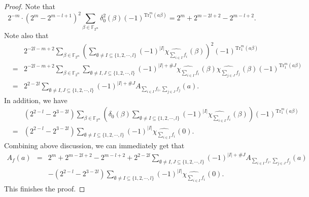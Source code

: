 \documentclass[10pt]{article}
\newcommand{\F}{\mathbb{F}}
\newcommand{\0}{\textbf{0}}
\newcommand{\1}{\textbf{1}}
\newcommand{\Tr}{\mathrm{Tr}_1^m}
\newcommand{\W}[2][]{\widehat{\chi_{#2}}^{#1}}
\newcommand{\CardI}{\left|I\right|}
\begin{document}
{\begin{proof}
Note that
$$2^{-m}\cdot \left(2^m-2^{m-l+1}\right)^2\sum_{\beta\in\F_{2^m}}\delta_0^2(\beta)(-1)^{\Tr({a}\beta)}=2^m+2^{m-2l+2}-2^{m-l+2}.$$
Note also that
\begin{eqnarray*}
&&2^{-2l-m+2}\sum_{\beta\in\F_{2^m}}\left(\sum_{\emptyset\neq I\subseteq \{1,2,\cdots, l\}}(-1)^{\CardI}\W {\sum\limits_{i\in I}f_i}(\beta)\right)^2(-1)^{\Tr({a}\beta)}\\
&=&2^{-2l-m+2}\sum_{\beta\in\F_{2^m}}\sum_{\emptyset\neq I, J \subseteq \{1,2,\cdots, l\}}(-1)^{\CardI+\# J}\W {\sum\limits_{i\in I}f_i}(\beta)\W {\sum\limits_{j\in J}f_j}(\beta)(-1)^{\Tr({a}\beta)}\\
&=&2^{2-2l}\sum_{\emptyset\neq I, J \subseteq \{1,2,\cdots, l\}}(-1)^{\CardI+\# J}A_{\sum\limits_{i\in I}f_i, \sum\limits_{j\in J}f_j}({a}).
\end{eqnarray*}
In addition, we have
\begin{eqnarray*}
&&(2^{2-l}-2^{3-2l})\sum_{\beta\in\F_{2^m}}\left(\delta_0(\beta)\sum_{\emptyset\neq I\subseteq \{1,2,\cdots, l\}}(-1)^{\CardI}\W {\sum_{i\in I}f_i}(\beta)\right)(-1)^{\Tr({a}\beta)}\\
&=&(2^{2-l}-2^{3-2l})\sum_{\emptyset\neq I\subseteq \{1,2,\cdots, l\}}(-1)^{\CardI}\W {\sum_{i\in I}f_i}(0).
\end{eqnarray*}
Combining above discussion, we can immediately get that
\begin{eqnarray*}
A_f({a})&=&2^m+2^{m-2l+2}-2^{m-l+2}+2^{2-2l}\sum_{\emptyset\neq I, J \subseteq \{1,2,\cdots, l\}}(-1)^{\CardI+\# J}A_{\sum\limits_{i\in I}f_i, \sum\limits_{j\in J}f_j}({a})\\
&&-(2^{2-l}-2^{3-2l})\sum_{\emptyset\neq I\subseteq \{1,2,\cdots, l\}}(-1)^{\CardI}\W {\sum_{i\in I}f_i}(0).
\end{eqnarray*}
This finishes the proof.
\end{proof}


}
\end{document}
